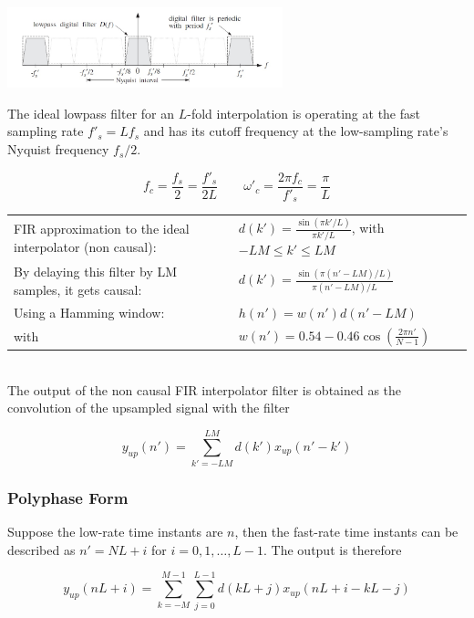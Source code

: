 \begin{center}
	\includegraphics[width=8cm]{images/IntDecOv_Filter.jpg}
\end{center}

The ideal lowpass filter for an $L$-fold interpolation is operating at the fast
sampling rate $f'_s=L f_s$ and has its cutoff frequency at the low-sampling
rate's Nyquist frequency $f_s/2$.

\begin{equation*}
	f_c = \frac{f_s}{2}=\frac{f'_s}{2L}
	\qquad
	\omega'_c = \frac{2\pi f_c}{f'_s}=\frac{\pi}{L}
\end{equation*}

\begin{tabularx}{\linewidth}{Xl}
	FIR approximation to the ideal interpolator (non causal):
	& $d(k')=\frac{\sin(\pi k'/L)}{\pi k'/L}$, with $-LM\leq k'\leq LM$\\
	By delaying this filter by LM samples, it gets causal: 
	& $d(k')=\frac{\sin(\pi (n'-LM)/L)}{\pi (n'-LM)/L}$ \\
	Using a Hamming window: & $h(n')=w(n')d(n'-LM)$ \\
	with & $w(n') = 0.54-0.46\cos(\frac{2\pi n'}{N-1})$ \\
\end{tabularx} \\

The output of the non causal FIR interpolator filter is obtained as the
convolution of the upsampled signal with the filter 

\begin{equation*}
	y_{up}(n') = \sum\limits_{k'=-LM}^{LM}d(k')x_{up}(n'-k')
\end{equation*}


\subsubsection{Polyphase Form}
Suppose the low-rate time instants are $n$, then the fast-rate time instants
can be described as $n' = NL+i$ for $i=0,1,\ldots,L-1$. The output is therefore

\begin{equation*}
	y_{up}(nL+i) = \sum\limits_{k=-M}^{M-1}\sum\limits_{j=0}^{L-1} d(kL+j) x_{up}(nL+i-kL-j)
\end{equation*}

